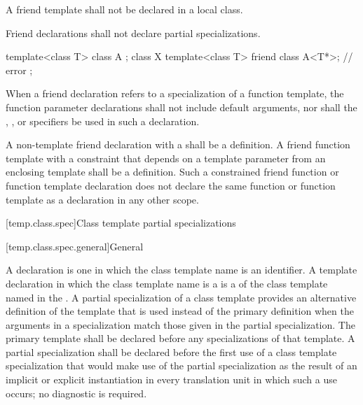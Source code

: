 \pnum
A friend template shall not be declared in a local class.

\pnum
Friend declarations shall not declare partial specializations.
\begin{example}
\begin{codeblock}
template<class T> class A { };
class X {
  template<class T> friend class A<T*>;         // error
};
\end{codeblock}
\end{example}

\pnum
When a friend declaration refers to a specialization of a function
template, the function parameter declarations shall not include
default arguments, nor shall
the , , or  specifiers
be used in such a declaration.

\pnum
A non-template friend declaration
with a 
shall be a definition.
A friend function template
with a constraint that depends on a template parameter from an enclosing template
shall be a definition.
Such a constrained friend function or function template declaration
does not declare the same function or function template as a declaration in any other scope.

[temp.class.spec]{Class template partial specializations}

[temp.class.spec.general]{General}

\pnum
{}%
%
A
declaration is one in which the class template name is an
identifier.
A template declaration in which the class template name is a
is a
of the class template named in the
.
A partial specialization of a class template provides an alternative definition
of the template that is used instead of the primary definition when the
arguments in a specialization match those given in the partial
specialization.
The primary template shall be declared before any specializations of
that template.
A partial specialization shall be declared before the first use of a class template
specialization that would make use of the partial specialization as the result of
an implicit or explicit instantiation in every translation unit in which such a use
occurs; no diagnostic is required.


